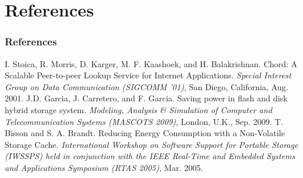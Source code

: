 \documentclass{beamer}
\begin{document}
\section{References}
%
\begin{frame}
    \frametitle{References}
    \footnotesize {
	\begin{thebibliography}{98}
	     I. Stoica, R. Morris, D. Karger, M. F. Kaashoek, and H. Balakrishnan.
		Chord: A Scalable Peer-to-peer Lookup Service for Internet Applications.
		\emph{Special Interest Group on Data Communication (SIGCOMM '01)},
		San Diego, California, Aug. 2001.
	     J.D. Garcia, J. Carretero, and F. Garcia.
		Saving power in flash and disk hybrid storage system.
		\emph{Modeling, Analysis \& Simulation of Computer and Telecommunication Systems
	    (MASCOTS 2009)}, London, U.K., Sep. 2009.
	 T. Bisson and S. A. Brandt.
	    Reducing Energy Consumption with a Non-Volatile Storage Cache.
	    \emph{International Workshop on Software Support for Portable Storage (IWSSPS)
		held in conjunction with the IEEE Real-Time and Embedded Systems and Applications
	    Symposium (RTAS 2005)}, Mar. 2005.
	\end{thebibliography}
    }
\end{frame}
%
\end{document}
